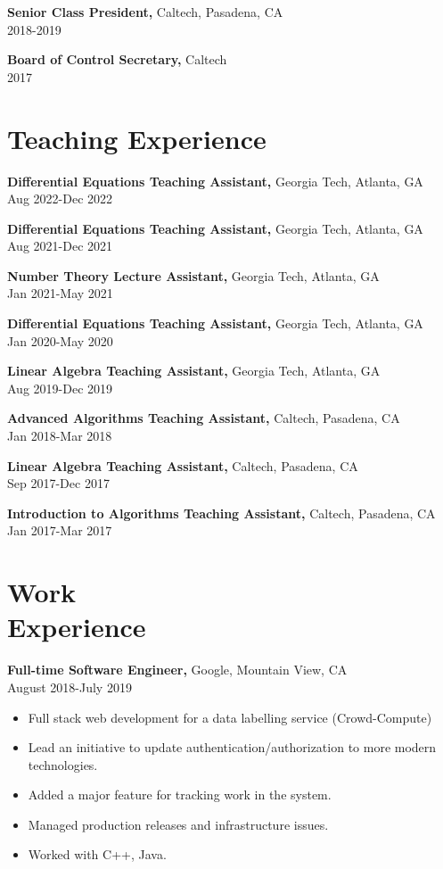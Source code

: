 \documentclass[margin]{res}
\begin{document}
\begin{resume}
       {\bf Senior Class President,} Caltech, Pasadena, CA    \\         2018-2019 

		{\bf Board of Control Secretary,} Caltech \\   2017

\section{Teaching Experience}
{\bf Differential Equations Teaching Assistant,} Georgia Tech, Atlanta, GA \\ Aug 2022-Dec 2022

{\bf Differential Equations Teaching Assistant,} Georgia Tech, Atlanta, GA \\ Aug 2021-Dec 2021

{\bf Number Theory Lecture Assistant,} Georgia Tech, Atlanta, GA \\ Jan 2021-May 2021

{\bf Differential Equations Teaching Assistant,} Georgia Tech, Atlanta, GA \\ Jan 2020-May 2020

{\bf Linear Algebra Teaching Assistant,} Georgia Tech, Atlanta, GA \\ Aug 2019-Dec 2019

{\bf Advanced Algorithms Teaching Assistant,} Caltech, Pasadena, CA \\ Jan 2018-Mar 2018

{\bf Linear Algebra Teaching Assistant,} Caltech, Pasadena, CA \\ Sep 2017-Dec 2017

{\bf Introduction to Algorithms Teaching Assistant,} Caltech, Pasadena, CA \\ Jan 2017-Mar 2017

 \section{Work\\ Experience}
 {\bf Full-time Software Engineer,} Google, Mountain View, CA \\ August 2018-July 2019
 \begin{itemize} \itemsep -2pt  %
 \item Full stack web development for a data labelling service (Crowd-Compute)
 \item Lead an initiative to update authentication/authorization to more modern technologies.
 \item Added a major feature for tracking work in the system.
 \item Managed production releases and infrastructure issues.
 \item Worked with C++, Java.
 \end{itemize}
 

\end{resume}
\end{document}
